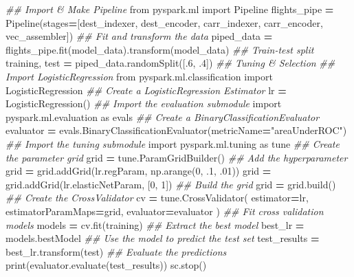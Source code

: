 \documentclass[]{book}
\newenvironment{Shaded}{\begin{snugshade}}{\end{snugshade}}
\newcommand{\BuiltInTok}[1]{#1}
\newcommand{\CommentTok}[1]{\textcolor[rgb]{0.56,0.35,0.01}{\textit{#1}}}
\newcommand{\DecValTok}[1]{\textcolor[rgb]{0.00,0.00,0.81}{#1}}
\newcommand{\FloatTok}[1]{\textcolor[rgb]{0.00,0.00,0.81}{#1}}
\newcommand{\ImportTok}[1]{#1}
\newcommand{\NormalTok}[1]{#1}
\newcommand{\OperatorTok}[1]{\textcolor[rgb]{0.81,0.36,0.00}{\textbf{#1}}}
\newcommand{\StringTok}[1]{\textcolor[rgb]{0.31,0.60,0.02}{#1}}
\begin{document}
\begin{Shaded}
\begin{Highlighting}[]
\CommentTok{## Import & Make Pipeline}
\ImportTok{from}\NormalTok{ pyspark.ml }\ImportTok{import}\NormalTok{ Pipeline}
\NormalTok{flights_pipe }\OperatorTok{=}\NormalTok{ Pipeline(stages}\OperatorTok{=}\NormalTok{[dest_indexer, dest_encoder, carr_indexer, carr_encoder, vec_assembler])}
\CommentTok{## Fit and transform the data}
\NormalTok{piped_data }\OperatorTok{=}\NormalTok{ flights_pipe.fit(model_data).transform(model_data)}
\CommentTok{## Train-test split}
\NormalTok{training, test }\OperatorTok{=}\NormalTok{ piped_data.randomSplit([.}\DecValTok{6}\NormalTok{, }\FloatTok{.4}\NormalTok{])}
\CommentTok{## Tuning & Selection}
\CommentTok{## Import LogisticRegression}
\ImportTok{from}\NormalTok{ pyspark.ml.classification }\ImportTok{import}\NormalTok{ LogisticRegression}
\CommentTok{## Create a LogisticRegression Estimator}
\NormalTok{lr }\OperatorTok{=}\NormalTok{ LogisticRegression()}
\CommentTok{## Import the evaluation submodule}
\ImportTok{import}\NormalTok{ pyspark.ml.evaluation }\ImportTok{as}\NormalTok{ evals}
\CommentTok{## Create a BinaryClassificationEvaluator}
\NormalTok{evaluator }\OperatorTok{=}\NormalTok{ evals.BinaryClassificationEvaluator(metricName}\OperatorTok{=}\StringTok{"areaUnderROC"}\NormalTok{)}
\CommentTok{## Import the tuning submodule}
\ImportTok{import}\NormalTok{ pyspark.ml.tuning }\ImportTok{as}\NormalTok{ tune}
\CommentTok{## Create the parameter grid}
\NormalTok{grid }\OperatorTok{=}\NormalTok{ tune.ParamGridBuilder()}
\CommentTok{## Add the hyperparameter}
\NormalTok{grid }\OperatorTok{=}\NormalTok{ grid.addGrid(lr.regParam, np.arange(}\DecValTok{0}\NormalTok{, }\FloatTok{.1}\NormalTok{, }\FloatTok{.01}\NormalTok{))}
\NormalTok{grid }\OperatorTok{=}\NormalTok{ grid.addGrid(lr.elasticNetParam, [}\DecValTok{0}\NormalTok{, }\DecValTok{1}\NormalTok{])}
\CommentTok{## Build the grid}
\NormalTok{grid }\OperatorTok{=}\NormalTok{ grid.build()}
\CommentTok{## Create the CrossValidator}
\NormalTok{cv }\OperatorTok{=}\NormalTok{ tune.CrossValidator(}
\NormalTok{estimator}\OperatorTok{=}\NormalTok{lr,}
\NormalTok{estimatorParamMaps}\OperatorTok{=}\NormalTok{grid,}
\NormalTok{evaluator}\OperatorTok{=}\NormalTok{evaluator}
\NormalTok{               )}
\CommentTok{## Fit cross validation models}
\NormalTok{models }\OperatorTok{=}\NormalTok{ cv.fit(training)}
\CommentTok{## Extract the best model}
\NormalTok{best_lr }\OperatorTok{=}\NormalTok{ models.bestModel}
\CommentTok{## Use the model to predict the test set}
\NormalTok{test_results }\OperatorTok{=}\NormalTok{ best_lr.transform(test)}
\CommentTok{## Evaluate the predictions}
\BuiltInTok{print}\NormalTok{(evaluator.evaluate(test_results))}
\NormalTok{sc.stop()}
\end{Highlighting}
\end{Shaded}
\end{document}
